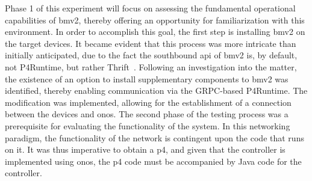 Phase 1 of this experiment will focus on assessing the fundamental operational capabilities of \gls{bmv2}, thereby offering an opportunity for familiarization with this environment. In order to accomplish this goal, the first step is installing \gls{bmv2} on the target devices. It became evident that this process was more intricate than initially anticipated, due to the fact the southbound \gls{api} of \gls{bmv2} is, by default, not P4Runtime, but rather Thrift~\cite{noauthor_apache_nodate}. Following an investigation into the matter, the existence of an option to install supplementary components to \gls{bmv2} was identified, thereby enabling communication via the GRPC-based P4Runtime. The modification was implemented, allowing for the establishment of a connection between the devices and \gls{onos}.
The second phase of the testing process was a prerequisite for evaluating the functionality of the system. In this networking paradigm, the functionality of the network is contingent upon the code that runs on it. It was thus imperative to obtain a \gls{p4}, and given that the controller is implemented using \gls{onos}, the \gls{p4} code must be accompanied by Java code for the controller. 

